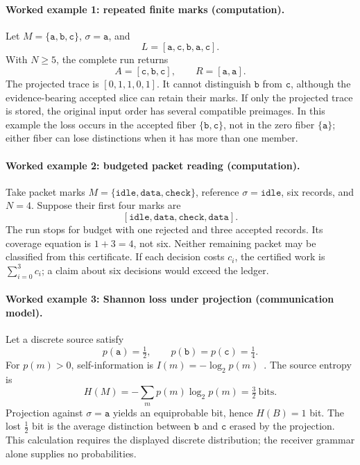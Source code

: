 \paragraph{Worked example 1: repeated finite marks (computation).}
Let \(M=\{\mathtt a,\mathtt b,\mathtt c\}\), \(\sigma=\mathtt a\), and
\[
 L=[\mathtt a,\mathtt c,\mathtt b,\mathtt a,\mathtt c].
\]
With \(N\ge5\), the complete run returns
\[
 A=[\mathtt c,\mathtt b,\mathtt c],\qquad
 R=[\mathtt a,\mathtt a].
\]
The projected trace is \([0,1,1,0,1]\).  It cannot distinguish \(\mathtt b\) from \(\mathtt c\), although the
evidence-bearing accepted slice can retain their marks.  If only the projected trace is stored, the original input order
has several compatible preimages.  In this example the loss occurs in the accepted fiber
\(\{\mathtt b,\mathtt c\}\), not in the zero fiber \(\{\mathtt a\}\); either fiber can lose distinctions when it has
more than one member.

\paragraph{Worked example 2: budgeted packet reading (computation).}
Take packet marks \(M=\{\mathtt{idle},\mathtt{data},\mathtt{check}\}\), reference
\(\sigma=\mathtt{idle}\), six records, and \(N=4\).  Suppose their first four marks are
\[
 [\mathtt{idle},\mathtt{data},\mathtt{check},\mathtt{data}].
\]
The run stops for budget with one rejected and three accepted records.  Its coverage equation is \(1+3=4\), not six.
Neither remaining packet may be classified from this certificate.  If each decision costs \(c_i\), the certified work
is \(\sum_{i=0}^{3}c_i\); a claim about six decisions would exceed the ledger.

\paragraph{Worked example 3: Shannon loss under projection (communication model).}
Let a discrete source satisfy
\[
 p(\mathtt a)=\tfrac12,\qquad p(\mathtt b)=p(\mathtt c)=\tfrac14.
\]
For \(p(m)>0\), self-information is \(I(m)=-\log_2p(m)\)~\cite{shannon1948}.  The source entropy is
\[
 H(M)=-\sum_m p(m)\log_2p(m)=\tfrac32\ \text{bits}.
\]
Projection against \(\sigma=\mathtt a\) yields an equiprobable bit, hence \(H(B)=1\) bit.  The lost
\(\tfrac12\) bit is the average distinction between \(\mathtt b\) and \(\mathtt c\) erased by the projection.  This
calculation requires the displayed discrete distribution; the receiver grammar alone supplies no probabilities.

